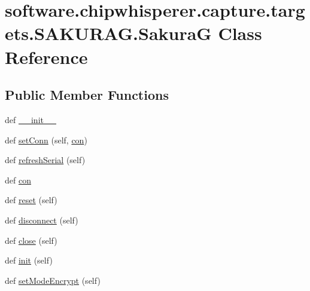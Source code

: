 \hypertarget{classsoftware_1_1chipwhisperer_1_1capture_1_1targets_1_1SAKURAG_1_1SakuraG}{}\section{software.\+chipwhisperer.\+capture.\+targets.\+S\+A\+K\+U\+R\+A\+G.\+Sakura\+G Class Reference}
\label{classsoftware_1_1chipwhisperer_1_1capture_1_1targets_1_1SAKURAG_1_1SakuraG}
\subsection*{Public Member Functions}
\begin{DoxyCompactItemize}
\item 
def \hyperlink{classsoftware_1_1chipwhisperer_1_1capture_1_1targets_1_1SAKURAG_1_1SakuraG_acd1e63b0e99788bec0f8000ee70255d5}{\+\_\+\+\_\+init\+\_\+\+\_\+}
\item 
def \hyperlink{classsoftware_1_1chipwhisperer_1_1capture_1_1targets_1_1SAKURAG_1_1SakuraG_aca29dbc1cb7952ca99b19122d446dbed}{set\+Conn} (self, \hyperlink{classsoftware_1_1chipwhisperer_1_1capture_1_1targets_1_1SAKURAG_1_1SakuraG_a280eb7d169b80ae3f2c6697c2385d356}{con})
\item 
def \hyperlink{classsoftware_1_1chipwhisperer_1_1capture_1_1targets_1_1SAKURAG_1_1SakuraG_a04e5a63264149d897f2055ae43546e2f}{refresh\+Serial} (self)
\item 
def \hyperlink{classsoftware_1_1chipwhisperer_1_1capture_1_1targets_1_1SAKURAG_1_1SakuraG_a280eb7d169b80ae3f2c6697c2385d356}{con}
\item 
def \hyperlink{classsoftware_1_1chipwhisperer_1_1capture_1_1targets_1_1SAKURAG_1_1SakuraG_a859f1f2569f3cb46c853c80ef2e45cee}{reset} (self)
\item 
def \hyperlink{classsoftware_1_1chipwhisperer_1_1capture_1_1targets_1_1SAKURAG_1_1SakuraG_af514366daf1e054e0dfc7454cfaeb1b6}{disconnect} (self)
\item 
def \hyperlink{classsoftware_1_1chipwhisperer_1_1capture_1_1targets_1_1SAKURAG_1_1SakuraG_acd1b91145b38396574319a54ec786162}{close} (self)
\item 
def \hyperlink{classsoftware_1_1chipwhisperer_1_1capture_1_1targets_1_1SAKURAG_1_1SakuraG_ab46fbdbcf973e547af7cb2b4f24fc696}{init} (self)
\item 
def \hyperlink{classsoftware_1_1chipwhisperer_1_1capture_1_1targets_1_1SAKURAG_1_1SakuraG_af98a445d0fc802ec27aec09e1f07db59}{set\+Mode\+Encrypt} (self)

\end{DoxyCompactItemize}
